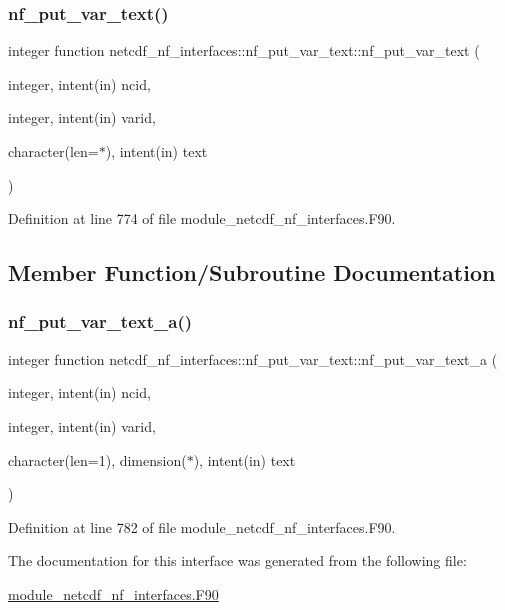 \subsubsection{\texorpdfstring{nf\+\_\+put\+\_\+var\+\_\+text()}{nf\_put\_var\_text()}}
{\footnotesize\ttfamily integer function netcdf\+\_\+nf\+\_\+interfaces\+::nf\+\_\+put\+\_\+var\+\_\+text\+::nf\+\_\+put\+\_\+var\+\_\+text (\begin{DoxyParamCaption}\item[{integer, intent(in)}]{ncid,  }\item[{integer, intent(in)}]{varid,  }\item[{character(len=$\ast$), intent(in)}]{text }\end{DoxyParamCaption})}



Definition at line 774 of file module\+\_\+netcdf\+\_\+nf\+\_\+interfaces.\+F90.



\subsection{Member Function/\+Subroutine Documentation}
\mbox{\label{interfacenetcdf__nf__interfaces_1_1nf__put__var__text_ab397e2fd15aec65aa5b76f2a2817d6c6}} 
\subsubsection{\texorpdfstring{nf\+\_\+put\+\_\+var\+\_\+text\+\_\+a()}{nf\_put\_var\_text\_a()}}
{\footnotesize\ttfamily integer function netcdf\+\_\+nf\+\_\+interfaces\+::nf\+\_\+put\+\_\+var\+\_\+text\+::nf\+\_\+put\+\_\+var\+\_\+text\+\_\+a (\begin{DoxyParamCaption}\item[{integer, intent(in)}]{ncid,  }\item[{integer, intent(in)}]{varid,  }\item[{character(len=1), dimension($\ast$), intent(in)}]{text }\end{DoxyParamCaption})}



Definition at line 782 of file module\+\_\+netcdf\+\_\+nf\+\_\+interfaces.\+F90.



The documentation for this interface was generated from the following file\+:\begin{DoxyCompactItemize}
\item 
\hyperlink{module__netcdf__nf__interfaces_8F90}{module\+\_\+netcdf\+\_\+nf\+\_\+interfaces.\+F90}\end{DoxyCompactItemize}

